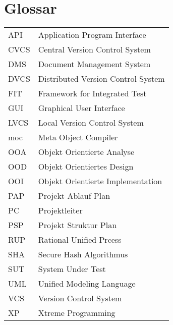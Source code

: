 \section*{Glossar}
\begin{tabular}{ll}
   API  & Application Program Interface \\ 
   CVCS & Central Version Control System \\ 
   DMS  & Document Management System \\ 
   DVCS & Distributed Version Control System \\ 
   FIT  & Framework for Integrated Test\\
   GUI  & Graphical User Interface \\ 
   LVCS & Local Version Control System\\ 
   moc  & Meta Object Compiler\\
   OOA  & Objekt Orientierte Analyse\\
   OOD  & Objekt Orientiertes Design\\
   OOI  & Objekt Orientierte Implementation\\
   PAP  & Projekt Ablauf Plan\\ 
   PC   & Projektleiter\\ 
   PSP  & Projekt Struktur Plan\\ 
   RUP  & Rational Unified Prcess\\
   SHA  & Secure Hash Algorithmus\\ 
   SUT  & System Under Test\\
   UML  & Unified Modeling Language\\
   VCS  & Version Control System\\ 
   XP   & Xtreme Programming \\ 
\end{tabular} 